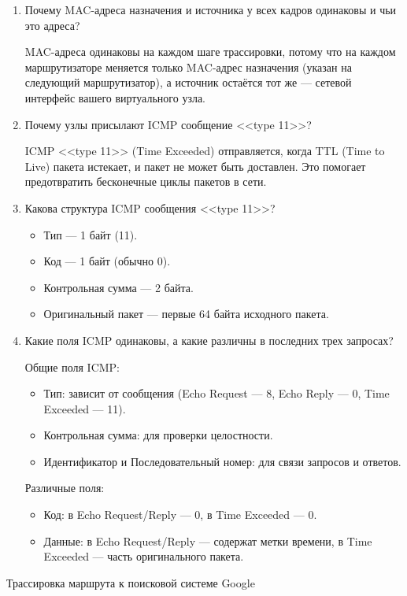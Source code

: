 \begin{enumerate}
	\item Почему MAC-адреса назначения
		и источника у всех кадров одинаковы и чьи это адреса? \par
		MAC-адреса одинаковы на каждом шаге трассировки,
		потому что на каждом маршрутизаторе меняется только MAC-адрес
		назначения (указан на следующий маршрутизатор),
		а источник остаётся тот же --- сетевой интерфейс
		вашего виртуального узла.
	\item Почему узлы присылают ICMP сообщение <<type 11>>? \par
		ICMP <<type 11>> (Time Exceeded) отправляется,
		когда TTL (Time to Live) пакета истекает,
		и пакет не может быть доставлен.
		Это помогает предотвратить бесконечные циклы пакетов в сети.
	\item Какова структура ICMP сообщения <<type 11>>?
		\begin{itemize}
			\item Тип --- 1 байт (11).
			\item Код --- 1 байт (обычно 0).
			\item Контрольная сумма --- 2 байта.
			\item Оригинальный пакет --- первые 64 байта исходного пакета.
		\end{itemize}
	\item Какие поля ICMP одинаковы,
		а какие различны в последних трех запросах? \par
		Общие поля ICMP:
		\begin{itemize}
			\item Тип: зависит от сообщения
				(Echo Request --- 8, Echo Reply --- 0, Time Exceeded --- 11).
			\item Контрольная сумма: для проверки целостности.
			\item Идентификатор и Последовательный номер:
				для связи запросов и ответов.
		\end{itemize}
		Различные поля:
		\begin{itemize}
			\item Код: в Echo Request/Reply --- 0, в Time Exceeded --- 0.
			\item Данные: в Echo Request/Reply --- содержат метки времени,
				в Time Exceeded --- часть оригинального пакета.
		\end{itemize}
\end{enumerate}

\begin{image}
	\caption{Трассировка маршрута к поисковой системе Google}
	\label{fig:wrsh:google:ping}
\end{image}

